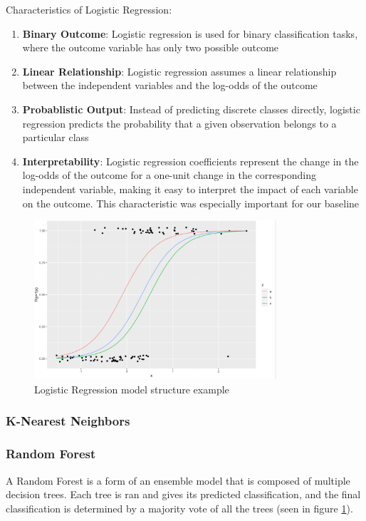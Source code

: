 \documentclass[10pt,sigconf,letterpaper,nonacm]{acmart}
\begin{document}
Characteristics of Logistic Regression:
\begin{enumerate}
  \item \textbf{Binary Outcome}: Logistic regression is used for binary classification tasks, where the outcome variable has only two possible outcome
  \item \textbf{Linear Relationship}: Logistic regression assumes a linear relationship between the independent variables and the log-odds of the outcome
  \item \textbf{Probablistic Output}: Instead of predicting discrete classes directly, logistic regression predicts the probability that a given observation belongs to a particular class
  \item \textbf{Interpretability}: Logistic regression coefficients represent the change in the log-odds of the outcome for a one-unit change in the corresponding independent variable, making it easy to interpret the impact of each variable on the outcome. This characteristic was especially important for our baseline
\end{enumerate}

\begin{figure}[h!]
  \centering
  \includegraphics[width=9cm]{Figures_and_Graphs/LogReg.png}
  \caption{Logistic Regression model structure example}
  \label{fig:RFExample}
\end{figure}

\subsubsection{K-Nearest Neighbors}

\subsubsection{Random Forest}
A Random Forest is a form of an ensemble model that is composed of multiple decision trees. Each tree is ran and gives its predicted classification, and the final classification is determined by a majority vote of all the trees (seen in figure \ref{fig:RFExample}).
\end{document}
